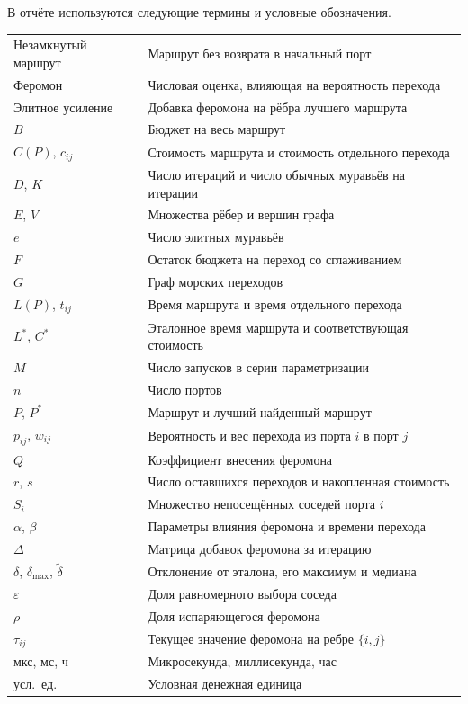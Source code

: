 
В отчёте используются следующие термины и условные обозначения.

\medskip
{\small\rightskip=0pt
\noindent\begin{tabularx}{\linewidth}{@{}l@{\enspace---\enspace}>{\raggedright\arraybackslash}X@{}}
Незамкнутый маршрут & Маршрут без возврата в начальный порт \\
Феромон & Числовая оценка, влияющая на вероятность перехода \\
Элитное усиление & Добавка феромона на рёбра лучшего маршрута \\
$B$ & Бюджет на весь маршрут \\
$C(P)$, $c_{ij}$ & Стоимость маршрута и стоимость отдельного перехода \\
$D$, $K$ & Число итераций и число обычных муравьёв на итерации \\
$E$, $V$ & Множества рёбер и вершин графа \\
$e$ & Число элитных муравьёв \\
$F$ & Остаток бюджета на переход со сглаживанием \\
$G$ & Граф морских переходов \\
$L(P)$, $t_{ij}$ & Время маршрута и время отдельного перехода \\
$L^*$, $C^*$ & Эталонное время маршрута и соответствующая стоимость \\
$M$ & Число запусков в серии параметризации \\
$n$ & Число портов \\
$P$, $P^*$ & Маршрут и лучший найденный маршрут \\
$p_{ij}$, $w_{ij}$ & Вероятность и вес перехода из порта $i$ в порт $j$ \\
$Q$ & Коэффициент внесения феромона \\
$r$, $s$ & Число оставшихся переходов и накопленная стоимость \\
$S_i$ & Множество непосещённых соседей порта $i$ \\
$\alpha$, $\beta$ & Параметры влияния феромона и времени перехода \\
$\Delta$ & Матрица добавок феромона за итерацию \\
$\delta$, $\delta_{\max}$, $\widetilde\delta$ & Отклонение от эталона, его максимум и медиана \\
$\varepsilon$ & Доля равномерного выбора соседа \\
$\rho$ & Доля испаряющегося феромона \\
$\tau_{ij}$ & Текущее значение феромона на ребре $\{i,j\}$ \\
мкс, мс, ч & Микросекунда, миллисекунда, час \\
усл.\ ед. & Условная денежная единица \\
\end{tabularx}\par}
